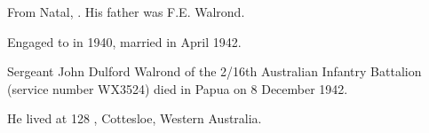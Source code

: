 
From Natal, .\cite{MartinWalmondEngagement, MartinWalmondMarriage}
His father was F.E. Walrond.\cite{MartinWalmondEngagement}

Engaged to  in 1940,\cite{MartinWalmondEngagement}
married in April 1942.\cite{MartinWalmondMarriage}

Sergeant John Dulford Walrond of the 2/16th Australian Infantry Battalion\cite{WestAust1943, AWMJohnWalrond} (service number WX3524)
died in Papua on 8 December 1942.\cite{AWMJohnWalrond}

He lived at 128 , Cottesloe, Western Australia.\cite{WestAust1943}
